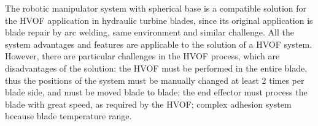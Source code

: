 


The robotic manipulator system with spherical base is a compatible solution
for the HVOF application in hydraulic turbine blades, since its
original application is blade repair by arc welding, same environment and
similar challenge. All the system advantages and features are applicable to
the solution of a HVOF system. However, there are particular challenges in the
HVOF process, which are disadvantages of the solution: the HVOF must be
performed in the entire blade, thus the positions of the system must be
manually changed at least 2 times per blade side, and must be moved blade to
blade; the end effector must process the blade with great speed, as required
by the HVOF; complex adhesion system because blade temperature range.

